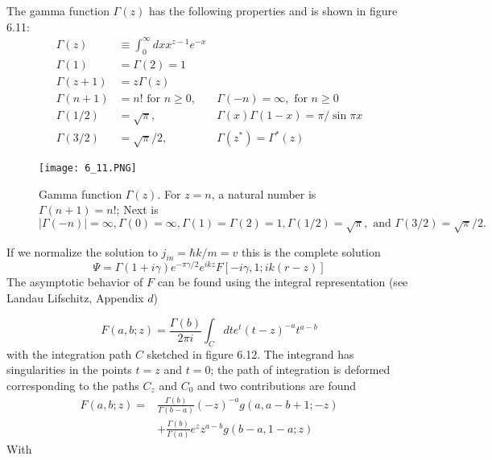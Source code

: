 \\\\
The gamma function $\Gamma (z)$ has the following properties and is shown in figure 6.11:
\begin{equation}
\begin{aligned} 
\Gamma(z) & \equiv \int_{0}^{\infty} d x x^{z-1} e^{-x} \\ \Gamma(1) &=\Gamma(2)=1 \\ 
\Gamma(z+1) &=z \Gamma(z) \\ 
\Gamma(n+1) &=n ! \text { for } n \geq 0, \quad &\Gamma(-n)=\infty, \text { for } n \geq 0 \\ 
\Gamma(1 / 2) &=\sqrt{\pi}, \quad &\Gamma(x) \Gamma(1-x)=\pi / \sin \pi x \\ 
\Gamma(3 / 2) &=\sqrt{\pi} / 2, \quad &\Gamma\left(z^{*}\right)=\Gamma^{*}(z) \end{aligned}
\end{equation}
\begin{figure}[ht]
    \begin{minipage}{0.6\textwidth}
        \centering
        \texttt{[image: 6\_11.PNG]}
    \end{minipage}
    \begin{minipage}{0.4\textwidth}
        \caption{Gamma function $\Gamma(z)$. For $z = n$, a natural number is $\Gamma (n + 1) = n !$; Next is $| \Gamma (-n) | = \infty, \Gamma (0) = \infty, \Gamma(1)= \Gamma(2) = 1, \Gamma (1/2) = \sqrt{\pi}, \text{ and }\Gamma (3/2) = \sqrt{\pi} / 2.$}
    \end{minipage}
\end{figure}
If we normalize the solution to $j_{in} = \hbar k / m = v$ this is the complete solution
\begin{equation}
    \Psi=\Gamma(1+i \gamma) e^{-\pi \gamma / 2} e^{i k z} F[-i \gamma, 1 ; i k(r-z)]
    \end{equation}
The asymptotic behavior of $F$ can be found using the integral representation (see Landau Lifschitz, Appendix $d$)

\begin{equation}
    F(a, b ; z)=\frac{\Gamma(b)}{2 \pi i} \int_{C} d t e^{t}(t-z)^{-a} t^{a-b}
    \end{equation}
with the integration path $C$ sketched in figure 6.12. The integrand has singularities in the points $t = z$ and $t = 0$; the path of integration is deformed corresponding to the paths $C_z$ and $C_0$ and two contributions are found
\begin{equation}
\begin{aligned} F(a, b ; z)=& \frac{\Gamma(b)}{\Gamma(b-a)}(-z)^{-a} g(a, a-b+1 ;-z) \\ &+\frac{\Gamma(b)}{\Gamma(a)} e^{z} z^{a-b} g(b-a, 1-a ; z) \end{aligned}
\end{equation}
With

